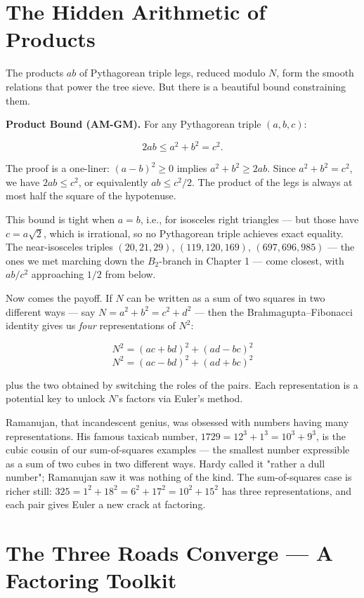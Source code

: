 \documentclass[11pt,twoside,openright]{book}
\theoremstyle{definition}
\theoremstyle{remark}
\begin{document}
\section{The Hidden Arithmetic of Products}

The products $ab$ of Pythagorean triple legs, reduced modulo $N$, form the smooth relations that power the tree sieve. But there is a beautiful bound constraining them.

\textbf{Product Bound (AM-GM).} For any Pythagorean triple $(a, b, c)$:

\[2ab \leq a^2 + b^2 = c^2.\]

The proof is a one-liner: $(a - b)^2 \geq 0$ implies $a^2 + b^2 \geq 2ab$. Since $a^2 + b^2 = c^2$, we have $2ab \leq c^2$, or equivalently $ab \leq c^2/2$. The product of the legs is always at most half the square of the hypotenuse.

This bound is tight when $a = b$, i.e., for isosceles right triangles --- but those have $c = a\sqrt{2}$, which is irrational, so no Pythagorean triple achieves exact equality. The near-isosceles triples $(20, 21, 29)$, $(119, 120, 169)$, $(697, 696, 985)$ --- the ones we met marching down the $B_2$-branch in Chapter 1 --- come closest, with $ab/c^2$ approaching $1/2$ from below.

Now comes the payoff. If $N$ can be written as a sum of two squares in two different ways --- say $N = a^2 + b^2 = c^2 + d^2$ --- then the Brahmagupta--Fibonacci identity gives us \textit{four} representations of $N^2$:

\[N^2 = (ac + bd)^2 + (ad - bc)^2\]
\[N^2 = (ac - bd)^2 + (ad + bc)^2\]

plus the two obtained by switching the roles of the pairs. Each representation is a potential key to unlock $N$'s factors via Euler's method.


Ramanujan, that incandescent genius, was obsessed with numbers having many representations. His famous taxicab number, $1729 = 12^3 + 1^3 = 10^3 + 9^3$, is the cubic cousin of our sum-of-squares examples --- the smallest number expressible as a sum of two cubes in two different ways. Hardy called it "rather a dull number"; Ramanujan saw it was nothing of the kind. The sum-of-squares case is richer still: $325 = 1^2 + 18^2 = 6^2 + 17^2 = 10^2 + 15^2$ has three representations, and each pair gives Euler a new crack at factoring.


\section{The Three Roads Converge --- A Factoring Toolkit}
\end{document}
